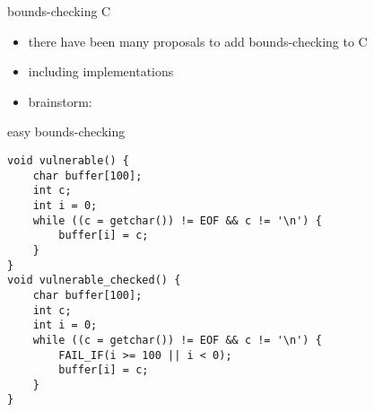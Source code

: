 \begin{frame}{bounds-checking C}
    \begin{itemize}
    \item there have been many proposals to add bounds-checking to C
    \item including implementations
    \item brainstorm: 
    \end{itemize}
\end{frame}

\begin{frame}[fragile,label=addBounds]{easy bounds-checking}
    \lstset{language=C,style=smaller}
\begin{lstlisting}
void vulnerable() {
    char buffer[100];
    int c;
    int i = 0;
    while ((c = getchar()) != EOF && c != '\n') {
        buffer[i] = c;
    }
}
void vulnerable_checked() {
    char buffer[100];
    int c;
    int i = 0;
    while ((c = getchar()) != EOF && c != '\n') {
        FAIL_IF(i >= 100 || i < 0);
        buffer[i] = c;
    }
}
\end{lstlisting}
\end{frame}
